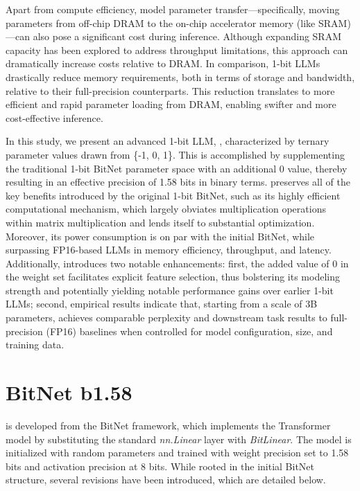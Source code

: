 Apart from compute efficiency, model parameter transfer—specifically, moving parameters from off-chip DRAM to the on-chip accelerator memory (like SRAM)—can also pose a significant cost during inference. Although expanding SRAM capacity has been explored to address throughput limitations, this approach can dramatically increase costs relative to DRAM. In comparison, 1-bit LLMs drastically reduce memory requirements, both in terms of storage and bandwidth, relative to their full-precision counterparts. This reduction translates to more efficient and rapid parameter loading from DRAM, enabling swifter and more cost-effective inference.

In this study, we present an advanced 1-bit LLM, \textbf{}, characterized by ternary parameter values drawn from \{-1, 0, 1\}. This is accomplished by supplementing the traditional 1-bit BitNet parameter space with an additional 0 value, thereby resulting in an effective precision of 1.58 bits in binary terms.  preserves all of the key benefits introduced by the original 1-bit BitNet, such as its highly efficient computational mechanism, which largely obviates multiplication operations within matrix multiplication and lends itself to substantial optimization. Moreover, its power consumption is on par with the initial BitNet, while surpassing FP16-based LLMs in memory efficiency, throughput, and latency. Additionally,  introduces two notable enhancements: first, the added value of 0 in the weight set facilitates explicit feature selection, thus bolstering its modeling strength and potentially yielding notable performance gains over earlier 1-bit LLMs; second, empirical results indicate that, starting from a scale of 3B parameters,  achieves comparable perplexity and downstream task results to full-precision (FP16) baselines when controlled for model configuration, size, and training data.

\section{BitNet b1.58}

 is developed from the BitNet framework, which implements the Transformer model by substituting the standard \emph{nn.Linear} layer with \emph{BitLinear}. The model is initialized with random parameters and trained with weight precision set to 1.58 bits and activation precision at 8 bits. While rooted in the initial BitNet structure, several revisions have been introduced, which are detailed below.

